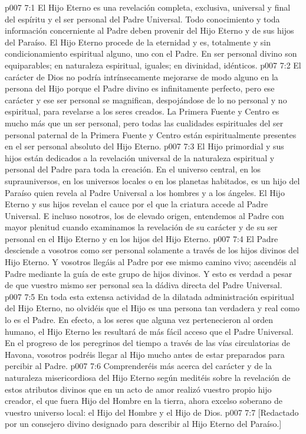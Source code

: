 \vs p007 7:1 El Hijo Eterno es una revelación completa, exclusiva, universal y final del espíritu y el ser personal del Padre Universal. Todo conocimiento y toda información concerniente al Padre deben provenir del Hijo Eterno y de sus hijos del Paraíso. El Hijo Eterno procede de la eternidad y es, totalmente y sin condicionamiento espiritual alguno, uno con el Padre. En ser personal divino son equiparables; en naturaleza espiritual, iguales; en divinidad, idénticos.
\vs p007 7:2 El carácter de Dios no podría intrínsecamente mejorarse de modo alguno en la persona del Hijo porque el Padre divino es infinitamente perfecto, pero ese carácter y ese ser personal se magnifican, despojándose de lo no personal y no espiritual, para revelarse a los seres creados. La Primera Fuente y Centro es mucho más que un ser personal, pero todas las cualidades espirituales del ser personal paternal de la Primera Fuente y Centro están espiritualmente presentes en el ser personal absoluto del Hijo Eterno.
\vs p007 7:3 El Hijo primordial y sus hijos están dedicados a la revelación universal de la naturaleza espiritual y personal del Padre para toda la creación. En el universo central, en los suprauniversos, en los universos locales o en los planetas habitados, es un hijo del Paraíso quien revela al Padre Universal a los hombres y a los ángeles. El Hijo Eterno y sus hijos revelan el cauce por el que la criatura accede al Padre Universal. E incluso nosotros, los de elevado origen, entendemos al Padre con mayor plenitud cuando examinamos la revelación de su carácter y de su ser personal en el Hijo Eterno y en los hijos del Hijo Eterno.
\vs p007 7:4 El Padre desciende a vosotros como ser personal solamente a través de los hijos divinos del Hijo Eterno. Y vosotros llegáis al Padre por ese mismo camino vivo; ascendéis al Padre mediante la guía de este grupo de hijos divinos. Y esto es verdad a pesar de que vuestro mismo ser personal sea la dádiva directa del Padre Universal.
\vs p007 7:5 \pc En toda esta extensa actividad de la dilatada administración espiritual del Hijo Eterno, no olvidéis que el Hijo es una persona tan verdadera y real como lo es el Padre. En efecto, a los seres que alguna vez pertenecieron al orden humano, el Hijo Eterno les resultará de más fácil acceso que el Padre Universal. En el progreso de los peregrinos del tiempo a través de las vías circulatorias de Havona, vosotros podréis llegar al Hijo mucho antes de estar preparados para percibir al Padre.
\vs p007 7:6 Comprenderéis más acerca del carácter y de la naturaleza misericordiosa del Hijo Eterno según meditéis sobre la revelación de estos atributos divinos que en un acto de amor realizó vuestro propio hijo creador, el que fuera Hijo del Hombre en la tierra, ahora excelso soberano de vuestro universo local: el Hijo del Hombre y el Hijo de Dios.
\vsetoff
\vs p007 7:7 [Redactado por un consejero divino designado para describir al Hijo Eterno del Paraíso.]

